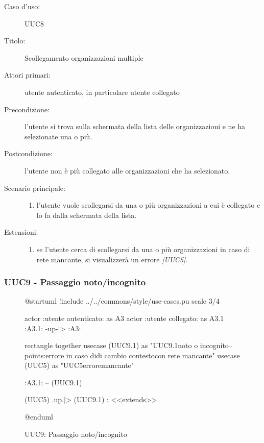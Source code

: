 \documentclass[../analisi-dei-requisiti.tex]{subfiles}
\begin{document}
\begin{description}
  \item[Caso d’uso:] UUC8
  \item[Titolo:] Scollegamento organizzazioni multiple
  \item[Attori primari:] utente autenticato, in particolare utente collegato
  \item[Precondizione:] l'utente si trova sulla schermata della lista delle organizzazioni e ne ha selezionate una o più.
  \item[Postcondizione:] l'utente non è più collegato alle organizzazioni che ha selezionato.
  \item[Scenario principale:]
        \begin{enumerate}
          \item l'utente vuole scollegarsi da una o più organizzazioni a cui è collegato e lo fa dalla schermata della lista.
        \end{enumerate}
  \item[Estensioni:]
        \begin{enumerate}
          \item se l'utente cerca di scollegarsi da una o più organizzazioni in caso di rete mancante, si visualizzerà un errore \emph{[UUC5]}.
        \end{enumerate}
\end{description}

\subsubsection{UUC9 - Passaggio noto/incognito}%
\label{subsub:UUC9utente}

\begin{figure}[h!]
  \centering
  \begin{plantuml}
  @startuml
  !include ../../commons/style/use-cases.pu
  scale 3/4

  actor :utente autenticato: as A3
  actor :utente collegato: as A3.1
  :A3.1: -up-|> :A3:

  rectangle {
    together {
      usecase (UUC9.1) as "UUC9.1\nScelta noto o incognito\n--\nExtension points:\nVisualizzazione errore in caso di\noperazione di cambio contesto\n con rete mancante"
      usecase (UUC5) as "UUC5\nVisualizzazione errore\nrete mancante"
    }
  }

  :A3.1: -- (UUC9.1)

  (UUC5) .up.|> (UUC9.1) : <<extends>>

  @enduml
  \end{plantuml}
  \caption{UUC9: Passaggio noto/incognito}
  \label{fig:uuc9}
\end{figure}
\end{document}
